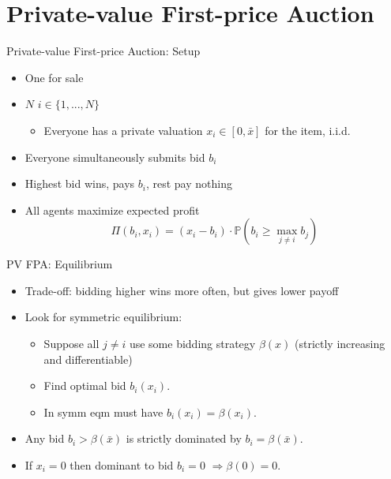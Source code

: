 \documentclass[english,10pt
,aspectratio=169
]{beamer}
\begin{document}
\section{Private-value First-price Auction}

\begin{frame}{Private-value First-price Auction: Setup}
	\begin{itemize}
		\item One  for sale
		\item $N$  $i \in \{1,...,N\}$
		\begin{itemize}
			\item Everyone has a private valuation $x_i \in [0,\bar{x}]$ for the item, i.i.d.
		\end{itemize}
		\item Everyone simultaneously submits bid $b_i$
		\item Highest bid wins, pays $b_i$, rest pay nothing
		\item All agents maximize expected profit
		\[ 
			\Pi(b_i,x_i) = \left( x_i - b_i \right) \cdot \mathbb{P} \left( b_i \geq \max_{j\neq i} b_j \right) 
		\]
	\end{itemize}
\end{frame}


\begin{frame}{PV FPA: Equilibrium}
	\begin{itemize}
		\item Trade-off: bidding higher wins more often, but gives lower payoff
		\item Look for symmetric equilibrium:
		\begin{itemize}
			\item Suppose all $j\neq i$ use some bidding strategy $\beta(x)$ (strictly increasing and differentiable)
			\item Find optimal bid $b_i(x_i)$.
			\item In symm eqm must have $b_i(x_i) = \beta(x_i)$.
		\end{itemize}
		\item Any bid $b_i > \beta(\bar{x})$ is strictly dominated by $b_i = \beta(\bar{x})$.
		\item If $x_i=0$ then dominant to bid $b_i=0$ $\Rightarrow \beta(0)=0$.
	\end{itemize}
\end{frame}
\end{document}
